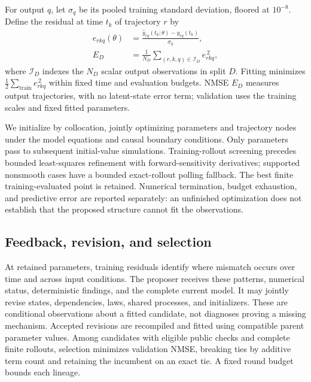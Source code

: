 For output $q$, let $\sigma_q$ be its pooled training standard deviation, floored
at $10^{-8}$. Define the residual at time $t_k$ of trajectory $r$ by
\begin{equation}
 \begin{aligned}
 e_{rkq}(\theta)&=
 \frac{\widehat y_{rq}(t_k;\theta)-y_{rq}(t_k)}{\sigma_q},\\
 E_D&=\frac{1}{N_D}\sum_{(r,k,q)\in\mathcal I_D}e_{rkq}^{\,2},
 \end{aligned}
 \label{eq:af-loss}
\end{equation}
where $\mathcal I_D$ indexes the $N_D$ scalar output observations in split $D$.
Fitting minimizes
$\frac12\sum_{\mathrm{train}}e_{rkq}^{\,2}$ within fixed time and evaluation
budgets. NMSE $E_D$ measures output trajectories, with no latent-state error term;
validation uses the training scales and fixed fitted parameters.

We initialize by collocation, jointly optimizing parameters and trajectory nodes
under the model equations and causal boundary conditions. Only parameters pass
to subsequent initial-value simulations. Training-rollout screening precedes
bounded least-squares refinement with forward-sensitivity derivatives; supported
nonsmooth cases have a bounded exact-rollout polling fallback. The best finite
training-evaluated point is retained. Numerical termination, budget exhaustion,
and predictive error are reported separately: an unfinished optimization does
not establish that the proposed structure cannot fit the observations.

\subsection{Feedback, revision, and selection}
\label{sec:af-revision}

At retained parameters, training residuals identify where mismatch occurs over
time and across input conditions. The proposer receives these patterns, numerical
status, deterministic findings, and the complete current model. It may jointly
revise states, dependencies, laws, shared processes, and initializers. These are
conditional observations about a fitted candidate, not diagnoses proving a missing
mechanism. Accepted revisions are recompiled and fitted using compatible parent
parameter values. Among candidates with eligible public checks and complete
finite rollouts, selection minimizes validation NMSE, breaking ties by additive
term count and retaining the incumbent on an exact tie. A fixed round budget
bounds each lineage.

